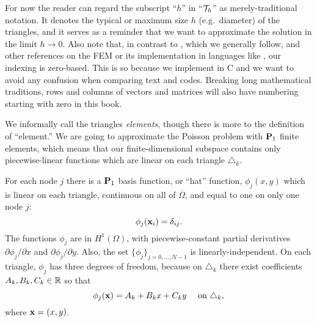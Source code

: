For now the reader can regard the subscript ``$h$'' in ``$\mathcal{T}_h$'' as merely-traditional notation.  It denotes the typical or maximum size $h$ (e.g.~diameter) of the triangles, and it serves as a reminder that we want to approximate the solution in the limit $h\to 0$.  Also note that, in contrast to \citet{Elmanetal2005}, which we generally follow, and other references on the FEM or its implementation in languages like \Matlab, our indexing is zero-based.  This is so because we implement in C and we want to avoid any confusion when comparing text and codes.  Breaking long mathematical traditions, rows and columns of vectors and matrices will also have numbering starting with zero in this book.

We informally call the triangles \emph{elements}, though there is more to the definition of ``element.''  We are going to approximate the Poisson problem with $\mathbf{P}_1$ finite elements, which means that our finite-dimensional subspace contains only piecewise-linear functions which are linear on each triangle $\triangle_k$.

For each node $j$ there is a $\mathbf{P}_1$ basis function, or ``hat'' function, $\phi_j(x,y)$ which is linear on each triangle, continuous on all of $\overline{\Omega}$, and equal to one on only one node $j$:%
\begin{equation*}
\phi_j(\mathbf{x}_i) = \delta_{ij}.
\end{equation*}
The functions $\phi_j$ are in $H^1(\Omega)$, with piecewise-constant partial derivatives $\partial\phi_j/\partial x$ and $\partial\phi_j/\partial y$.  Also, the set $\{\phi_j\}_{j=0,\dots,N-1}$ is linearly-independent.  On each triangle, $\phi_j$ has three degrees of freedom, because on $\triangle_k$ there exist coefficients $A_k,B_k,C_k\in\mathbb{R}$ so that
\begin{equation*}
\phi_j(\mathbf{x}) = A_k + B_k x + C_k y \quad \text{ on } \triangle_k,
\end{equation*}
where $\mathbf{x} = (x,y)$.

